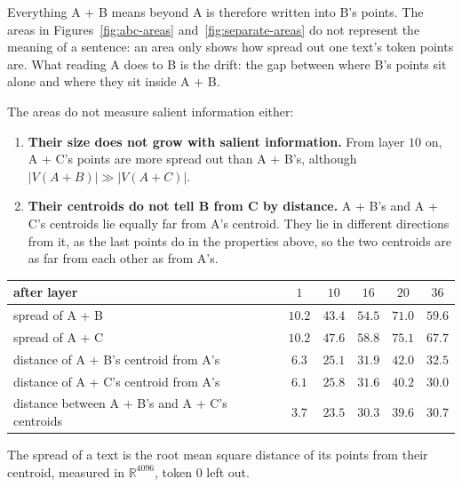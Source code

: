 \documentclass[11pt]{article}
\theoremstyle{remark}
\newcommand{\R}{\mathbb{R}}
\begin{document}
Everything A + B means beyond A is therefore written into B's points. The areas in Figures~\ref{fig:abc-areas} and~\ref{fig:separate-areas} do not represent the meaning of a sentence: an area only shows how spread out one text's token points are. What reading A does to B is the drift: the gap between where B's points sit alone and where they sit inside A + B.

The areas do not measure salient information either:
\begin{enumerate}
  \item \textbf{Their size does not grow with salient information.} From layer $10$ on, A + C's points are more spread out than A + B's, although $|V(A + B)| \gg |V(A + C)|$.
  \item \textbf{Their centroids do not tell B from C by distance.} A + B's and A + C's centroids lie equally far from A's centroid. They lie in different directions from it, as the last points do in the properties above, so the two centroids are as far from each other as from A's.
\end{enumerate}

\begin{center}
\begin{tabular}{lccccc}
\hline
after layer & $1$ & $10$ & $16$ & $20$ & $36$ \\
\hline
spread of A + B & $10.2$ & $43.4$ & $54.5$ & $71.0$ & $59.6$ \\
spread of A + C & $10.2$ & $47.6$ & $58.8$ & $75.1$ & $67.7$ \\
\hline
distance of A + B's centroid from A's & $6.3$ & $25.1$ & $31.9$ & $42.0$ & $32.5$ \\
distance of A + C's centroid from A's & $6.1$ & $25.8$ & $31.6$ & $40.2$ & $30.0$ \\
distance between A + B's and A + C's centroids & $3.7$ & $23.5$ & $30.3$ & $39.6$ & $30.7$ \\
\hline
\end{tabular}
\end{center}
The spread of a text is the root mean square distance of its points from their centroid, measured in $\R^{4096}$, token $0$ left out.

\begin{center}
\end{center}
\end{document}
